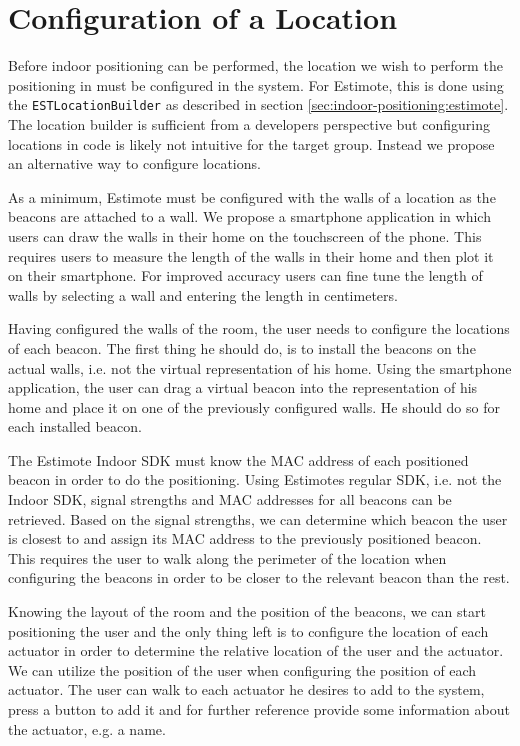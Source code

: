\section{Configuration of a Location}

Before indoor positioning can be performed, the location we wish to perform the positioning in must be configured in the system. For Estimote, this is done using the \texttt{ESTLocationBuilder} as described in section \ref{sec:indoor-positioning:estimote}. The location builder is sufficient from a developers perspective but configuring locations in code is likely not intuitive for the target group. Instead we propose an alternative way to configure locations.

As a minimum, Estimote must be configured with the walls of a location as the beacons are attached to a wall. We propose a smartphone application in which users can draw the walls in their home on the touchscreen of the phone. This requires users to measure the length of the walls in their home and then plot it on their smartphone. For improved accuracy users can fine tune the length of walls by selecting a wall and entering the length in centimeters.

Having configured the walls of the room, the user needs to configure the locations of each beacon. The first thing he should do, is to install the beacons on the actual walls, i.e. not the virtual representation of his home.
Using the smartphone application, the user can drag a virtual beacon into the representation of his home and place it on one of the previously configured walls. He should do so for each installed beacon.

The Estimote Indoor SDK must know the MAC address of each positioned beacon in order to do the positioning. Using Estimotes regular SDK, i.e. not the Indoor SDK, signal strengths and MAC addresses for all beacons can be retrieved. Based on the signal strengths, we can determine which beacon the user is closest to and assign its MAC address to the previously positioned beacon. This requires the user to walk along the perimeter of the location when configuring the beacons in order to be closer to the relevant beacon than the rest.

Knowing the layout of the room and the position of the beacons, we can start positioning the user and the only thing left is to configure the location of each actuator in order to determine the relative location of the user and the actuator. We can utilize the position of the user when configuring the position of each actuator. The user can walk to each actuator he desires to add to the system, press a button to add it and for further reference provide some information about the actuator, e.g. a name.

